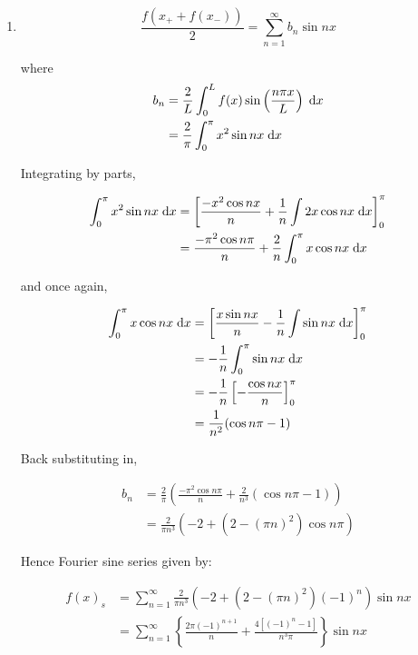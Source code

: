 \documentclass[a4paper]{article}
\begin{document}
\begin{enumerate}[label = (\alph*)]
	\item \[ \frac{f(x_{+} + f(x_{-}))}{2} =  \sum_{n=1}^{\infty} b_{n} \sin  n x   \]
	
	where 
	\begin{align*}
	b_{n} & = \frac{2}{L} \int_{0}^{L} f(x) \sin \left( \frac{n \pi x}{L} \right) \; \mathrm{d} x  \\
	& = \frac{2}{\pi} \int_{0}^{\pi} x^{2} \sin n x \; \mathrm{d} x
	\end{align*}
	
	Integrating by parts,
	
	\begin{align*}
	\int_{0}^{\pi} x^{2} \sin n x \; \mathrm{d} x & = \left[  \frac{- x^{2} \cos n x }{n} + \frac{1}{n} \int 2x \cos n x \; \mathrm{d} x \right]_{0}^{\pi}  \\
	& = \frac{- \pi^{2} \cos n \pi}{n} + \frac{2}{n} \int_{0}^{\pi} x \cos n x \; \mathrm{d} x
	\end{align*}
	
	and once again,
	
	\begin{align*}
	\int_{0}^{\pi} x \cos n x \; \mathrm{d} x & =\left[ \frac{x \sin n x}{n} - \frac{1}{n} \int \sin n x \; \mathrm{d} x \right]_{0}^{\pi}  \\
	& = - \frac{1}{n} \int_{0}^{\pi} \sin n x \; \mathrm{d} x \\
	& = - \frac{1}{n} \left[ - \frac{\cos n x}{n} \right]_{0}^{\pi}\\
	& = \frac{1}{n^{2}} (\cos n \pi - 1) 
	\end{align*}
	
	Back substituting in, 
	
	\begin{align*}
	b_{n} & = \frac{2}{\pi} \left( \frac{- \pi^{2} \cos n \pi}{n} + \frac{2}{n^{3}} (\cos n \pi - 1)   \right)  \\
	& = \frac{2}{\pi n^{3}} \left(   - 2 + (2 - (\pi n)^{2} )\cos n \pi       \right) 
	\end{align*}
	
	Hence Fourier sine series given by:
	
	\begin{align*}
	f(x)_{s} & = \sum_{n=1}^{\infty} \frac{2}{\pi n^{3}} \left(   - 2 + (2 - (\pi n)^{2} ) (-1)^{n} \right) \sin n x \\
	& = \sum_{n=1}^{\infty}\left\{  \frac{2 \pi (-1)^{n+1}  }{n} + \frac{4[(-1)^{n} - 1   ]}{n^{3} \pi}   \right\} \sin n x
	\end{align*}
	

\end{enumerate}
\end{document}
